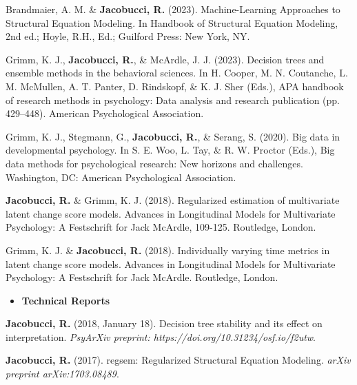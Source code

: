 \documentclass[letterpaper,10pt]{article}
\begin{document}
\begin{etaremune}
	\item Brandmaier, A. M. \& \textbf{Jacobucci, R.} (2023). Machine-Learning Approaches to Structural Equation Modeling. In Handbook of Structural Equation Modeling, 2nd ed.; Hoyle, R.H., Ed.; Guilford Press: New York, NY.
%
\item Grimm, K. J., \textbf{Jacobucci, R.}, \& McArdle, J. J. (2023). Decision trees and ensemble methods in the behavioral sciences. In H. Cooper, M. N. Coutanche, L. M. McMullen, A. T. Panter, D. Rindskopf, \& K. J. Sher (Eds.), APA handbook of research methods in psychology: Data analysis and research publication (pp. 429–448). American Psychological Association.
	\item Grimm, K. J., Stegmann, G., \textbf{Jacobucci, R.}, \& Serang, S. (2020). Big data in developmental psychology. In S. E. Woo, L. Tay, \& R. W. Proctor (Eds.), Big data methods for psychological research: New horizons and challenges. Washington, DC: American Psychological Association.
	\item  \textbf{Jacobucci, R.} \& Grimm, K. J. (2018). Regularized estimation of multivariate latent change score models. Advances in Longitudinal Models for Multivariate Psychology: A Festschrift for Jack McArdle, 109-125. Routledge, London.
	\item Grimm, K. J. \& \textbf{Jacobucci, R.} (2018). Individually varying time metrics in latent change score models. Advances in Longitudinal Models for Multivariate Psychology: A Festschrift for Jack McArdle. Routledge, London.
\end{etaremune}
\begin{itemize}
	\vspace{3mm}
	\item {\textbf{\large{Technical Reports}}}
\end{itemize}
\begin{etaremune}
	\item \textbf{Jacobucci, R.}  (2018, January 18). Decision tree stability and its effect on interpretation. \emph{PsyArXiv preprint: https://doi.org/10.31234/osf.io/f2utw}.
	\item \textbf{Jacobucci, R.} (2017). regsem: Regularized Structural Equation Modeling. \emph{arXiv preprint arXiv:1703.08489}.

\end{etaremune}
\end{document}
